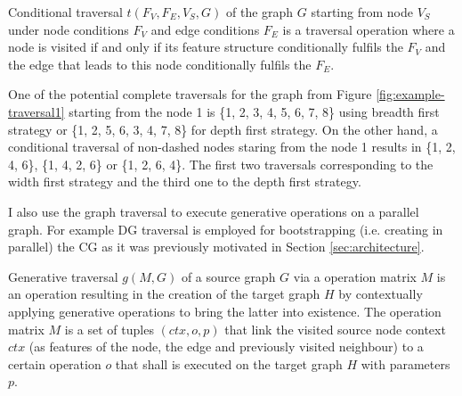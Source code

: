 
\begin{definition}\label{def:conditional-traversal}
    Conditional traversal $t(F_V,F_E,V_S,G)$ of the graph $G$ starting from node $V_S$ under node conditions $F_V$ and edge conditions $F_E$ is a traversal operation where a node is visited if and only if its feature structure conditionally fulfils the $F_V$ and the edge that leads to this node conditionally fulfils the $F_E$.
\end{definition}

One of the potential complete traversals for the graph from Figure \ref{fig:example-traversal1} starting from the node 1 is \{1, 2, 3, 4, 5, 6, 7, 8\} using breadth first strategy or \{1, 2, 5, 6, 3, 4, 7, 8\} for depth first strategy. On the other hand, a conditional traversal of non-dashed nodes staring from the node 1 results in \{1, 2, 4, 6\}, \{1, 4, 2, 6\} or \{1, 2, 6, 4\}. The first two traversals corresponding to the width first strategy and the third one to the depth first strategy. 

I also use the graph traversal to execute generative operations on a parallel graph. For example DG traversal is employed for bootstrapping (i.e. creating in parallel) the CG as it was previously motivated in Section \ref{sec:architecture}.

\begin{definition}\label{def:generative-traversal}
    Generative traversal $g(M,G)$ of a source graph $G$ via a operation matrix $M$ is an operation resulting in the creation of the target graph $H$ by contextually applying generative operations to bring the latter into existence. The operation matrix $M$ is a set of tuples $(ctx,o,p)$ that link the visited source node context $ctx$ (as features of the node, the edge and previously visited neighbour) to a certain operation $o$ that shall is executed on the target graph $H$ with parameters $p$.
\end{definition}


